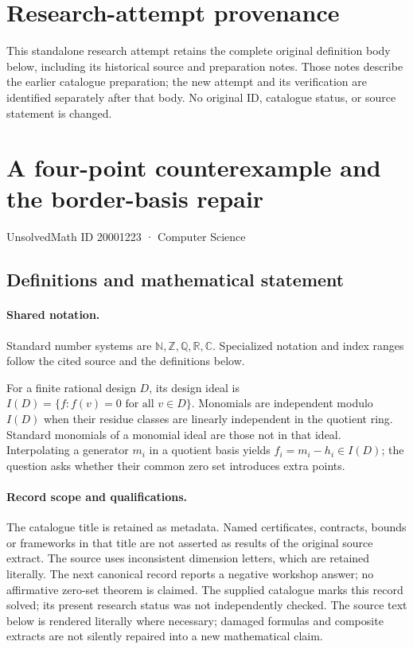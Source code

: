 \documentclass[11pt]{article}
\begin{document}
\section*{Research-attempt provenance}
This standalone research attempt retains the complete original definition body below,
including its historical source and preparation notes. Those notes describe the
earlier catalogue preparation; the new attempt and its verification are identified
separately after that body. No original ID, catalogue status, or source statement is changed.

\section{A four-point counterexample and the border-basis repair}\label{20001223}
{\small UnsolvedMath ID 20001223 · Computer Science}
\subsection{Definitions and mathematical statement}

\paragraph{Shared notation.}Standard number systems are $\mathbb N,\mathbb Z,\mathbb Q,\mathbb R,\mathbb C$. Specialized notation and index ranges follow the cited source and the definitions below.


For a finite rational design $D$, its design ideal is $I(D)=\{f:f(v)=0\text{ for all }v\in D\}$. Monomials are independent modulo $I(D)$ when their residue classes are linearly independent in the quotient ring. Standard monomials of a monomial ideal are those not in that ideal. Interpolating a generator $m_i$ in a quotient basis yields $f_i=m_i-h_i\in I(D)$; the question asks whether their common zero set introduces extra points.
\paragraph{Record scope and qualifications.}
The catalogue title is retained as metadata. Named certificates, contracts, bounds or frameworks in that title are not asserted as results of the original source extract.
The source uses inconsistent dimension letters, which are retained literally. The next canonical record reports a negative workshop answer; no affirmative zero-set theorem is claimed. The supplied catalogue marks this record solved; its present research status was not independently checked.
The source text below is rendered literally where necessary; damaged formulas and composite extracts are not silently repaired into a new mathematical claim.
\end{document}
